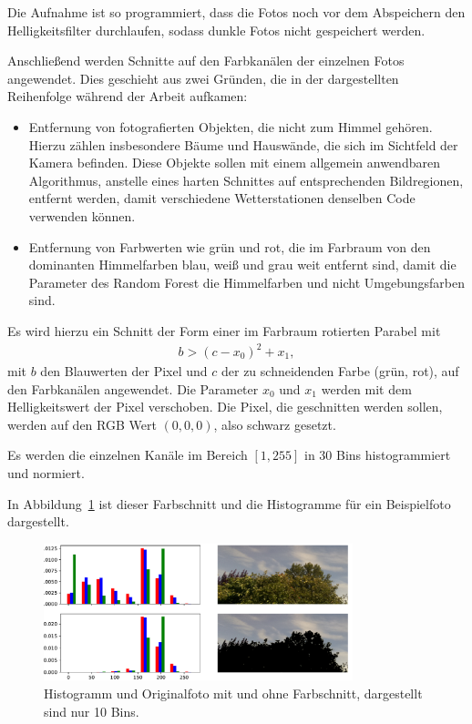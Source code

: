 Die Aufnahme ist so programmiert, dass die Fotos noch vor dem
Abspeichern den Helligkeitsfilter durchlaufen, sodass dunkle Fotos nicht
gespeichert werden.

Anschließend werden Schnitte auf den Farbkanälen der einzelnen Fotos
angewendet. Dies geschieht aus zwei Gründen, die in der dargestellten
Reihenfolge während der Arbeit aufkamen:

\begin{itemize}
\item
  Entfernung von fotografierten Objekten, die nicht zum Himmel gehören.
  Hierzu zählen insbesondere Bäume und Hauswände, die sich im Sichtfeld
  der Kamera befinden. Diese Objekte sollen mit einem allgemein
  anwendbaren Algorithmus, anstelle eines harten Schnittes auf
  entsprechenden Bildregionen, entfernt werden, damit verschiedene
  Wetterstationen denselben Code verwenden können.
\item
  Entfernung von Farbwerten wie grün und rot, die im Farbraum von den
  dominanten Himmelfarben blau, weiß und grau weit entfernt sind, damit
  die Parameter des Random Forest die Himmelfarben und nicht
  Umgebungsfarben sind.
\end{itemize}

Es wird hierzu ein Schnitt der Form einer im Farbraum rotierten Parabel
mit
\begin{align}
  b > {(c - x_0)}^2 + x_1,
\end{align}
mit $b$ den Blauwerten der Pixel und
$c$ der zu schneidenden Farbe (grün, rot), auf den Farbkanälen
angewendet. Die Parameter $x_0$ und $x_1$ werden mit dem
Helligkeitswert der Pixel verschoben. Die Pixel, die geschnitten werden
sollen, werden auf den RGB Wert $(0, 0, 0)$, also schwarz gesetzt.


Es werden die einzelnen Kanäle im Bereich $[1, 255]$ in 30 Bins
histogrammiert und normiert.

In Abbildung~\ref{fig:cut_hist} ist dieser Farbschnitt und die Histogramme für ein Beispielfoto dargestellt.

\begin{figure}
\centering
\includegraphics[width=0.8\textwidth]{pictures/cut_hist.pdf}
\caption{Histogramm und Originalfoto mit und ohne Farbschnitt, dargestellt sind nur 10 Bins.}%
\label{fig:cut_hist}
\end{figure}

